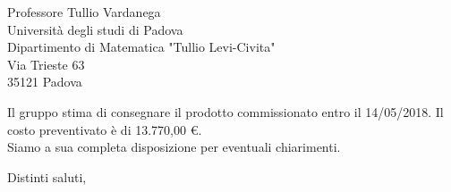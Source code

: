 \documentclass[12pt]{letter} %
\begin{document}
\begin{letter}{Professore Tullio Vardanega \\ Università degli studi di Padova \\ Dipartimento di Matematica "Tullio Levi-Civita" \\ Via Trieste 63 \\ 35121 Padova}
\begin{addmargin}[2em]{2em}
Il gruppo stima di consegnare il prodotto commissionato entro il 14/05/2018. Il costo preventivato è di 13.770,00 \euro. \\ Siamo a sua completa disposizione per eventuali chiarimenti.
  
\end{addmargin}




\closing{Distinti saluti,}




\end{letter}
 
\end{document}
